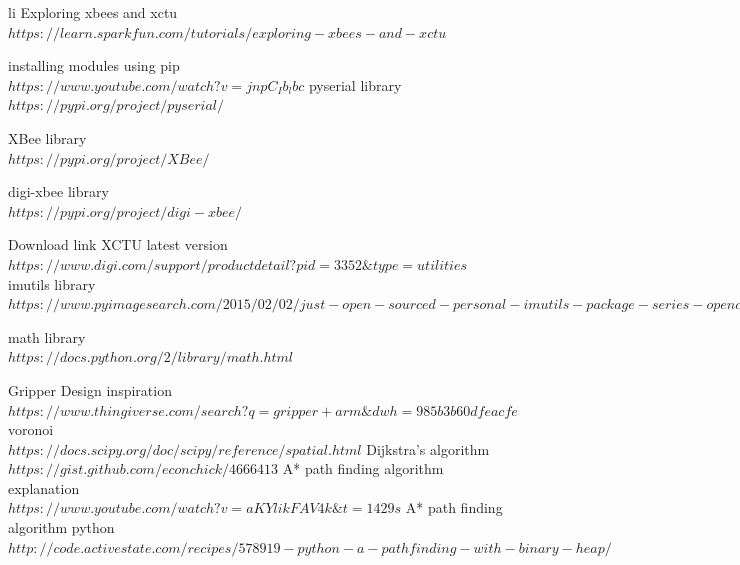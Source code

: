 \documentclass[a4paper,12pt,oneside]{book}
\begin{document}
\begin{thebibliography}{li}
{Exploring xbees and xctu}\\
${https://learn.sparkfun.com/tutorials/exploring-xbees-and-xctu}$

{installing modules using pip}\\
$https://www.youtube.com/watch?v=jnpC_Ib_lbc$
{pyserial library}\\
$https://pypi.org/project/pyserial/$

{XBee library}\\
$https://pypi.org/project/XBee/$

{digi-xbee library}\\
$https://pypi.org/project/digi-xbee/$

{Download link }XCTU latest version\\
$https://www.digi.com/support/productdetail?pid=3352\&type=utilities$
{imutils library}\\
$https://www.pyimagesearch.com/2015/02/02/just-open-sourced-personal-imutils-package-series-opencv-convenience-functions/$

{math library}\\
$https://docs.python.org/2/library/math.html$

Gripper Design inspiration\\
$https://www.thingiverse.com/search?q=gripper+arm\&dwh=985b3b60dfeacfe$
{voronoi}\\
$https://docs.scipy.org/doc/scipy/reference/spatial.html$
{Dijkstra's algorithm}\\
$https://gist.github.com/econchick/4666413$
{A* path finding algorithm explanation}\\
$https://www.youtube.com/watch?v=aKYlikFAV4k\&t=1429s$
{A* path finding algorithm python}\\
$http://code.activestate.com/recipes/578919-python-a-pathfinding-with-binary-heap/$

\end{thebibliography}
\end{document}
